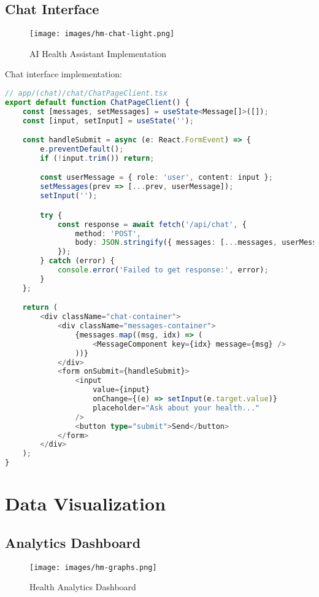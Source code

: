 \subsection{Chat Interface}
\begin{figure}[H]
    \centering
    \texttt{[image: images/hm-chat-light.png]}
    \caption{AI Health Assistant Implementation}
\end{figure}

Chat interface implementation:
\begin{lstlisting}[language=TypeScript, caption=Chat Implementation]
// app/(chat)/chat/ChatPageClient.tsx
export default function ChatPageClient() {
    const [messages, setMessages] = useState<Message[]>([]);
    const [input, setInput] = useState('');

    const handleSubmit = async (e: React.FormEvent) => {
        e.preventDefault();
        if (!input.trim()) return;

        const userMessage = { role: 'user', content: input };
        setMessages(prev => [...prev, userMessage]);
        setInput('');

        try {
            const response = await fetch('/api/chat', {
                method: 'POST',
                body: JSON.stringify({ messages: [...messages, userMessage] })
            });
        } catch (error) {
            console.error('Failed to get response:', error);
        }
    };

    return (
        <div className="chat-container">
            <div className="messages-container">
                {messages.map((msg, idx) => (
                    <MessageComponent key={idx} message={msg} />
                ))}
            </div>
            <form onSubmit={handleSubmit}>
                <input
                    value={input}
                    onChange={(e) => setInput(e.target.value)}
                    placeholder="Ask about your health..."
                />
                <button type="submit">Send</button>
            </form>
        </div>
    );
}
\end{lstlisting}

\section{Data Visualization}
\subsection{Analytics Dashboard}
\begin{figure}[H]
    \centering
    \texttt{[image: images/hm-graphs.png]}
    \caption{Health Analytics Dashboard}
\end{figure}

